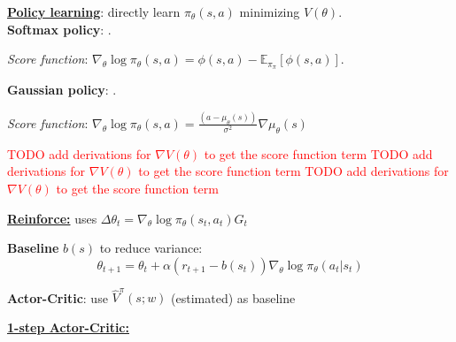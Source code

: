 \documentclass[10pt,landscape]{article}
\begin{document}
\begin{multicols}{3}
\vspace{2mm}

\underline{\textbf{Policy learning}}: directly learn $\pi_\theta(s,a)$ minimizing $V(\theta)$.
\\[2mm]

\textbf{Softmax policy}: . 

\textit{Score function}: $\nabla_\theta\log\pi_\theta(s,a)=\phi(s,a)-\mathbb{E}_{\pi_\pi}[\phi(s,a)].
$

\textbf{Gaussian policy}: . 

\textit{Score function}: $\nabla_\theta\log\pi_\theta(s,a)=
\frac{(a-\mu_\theta(s))}{\sigma^2}\nabla\mu_\theta(s)$

\vspace{2mm}

\textcolor{red}{TODO add derivations for $\nabla V(\theta)$ to get the score function term}
\textcolor{red}{TODO add derivations for $\nabla V(\theta)$ to get the score function term}
\textcolor{red}{TODO add derivations for $\nabla V(\theta)$ to get the score function term}

\vspace{2mm}

\underline{\textbf{Reinforce:}} uses $\Delta\theta_t=\nabla_\theta \log\pi_\theta(s_t,a_t)G_t$
\begin{algorithm}[H]
\end{algorithm}

\textbf{Baseline} $b(s)$ to reduce variance:
$$
\theta_{t+1}=\theta_t+\alpha(r_{t+1}-b(s_t))\nabla_\theta\log\pi_\theta(a_t|s_t)$$

\textbf{Actor-Critic}: use $\hat{V}^\pi(s;w)$ (estimated) as baseline

\vspace{2mm}

\underline{\textbf{1-step Actor-Critic:}}
\begin{algorithm}[H]
\end{algorithm}


\end{multicols}
\end{document}
